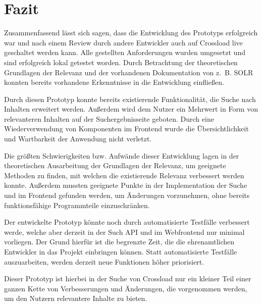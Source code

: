 \chapter{Fazit}
\label{ch:summary}

Zusammenfassend lässt sich sagen, dass die Entwicklung des Prototyps erfolgreich war und nach einem Review durch andere Entwickler auch auf Crossload live geschaltet werden kann.
Alle gestellten Anforderungen wurden umgesetzt und sind erfolgreich lokal getestet worden.
Durch Betrachtung der theoretischen Grundlagen der Relevanz und der vorhandenen Dokumentation von z. B. SOLR konnten bereits vorhandene Erkenntnisse in die Entwicklung einfließen.

Durch diesen Prototyp konnte bereits existierende Funktionalität, die Suche nach Inhalten erweitert werden.
Außerdem wird dem Nutzer ein Mehrwert in Form von relevanteren Inhalten auf der Suchergebnisseite geboten.
Durch eine Wiederverwendung von Komponenten im Frontend wurde die Übersichtlichkeit und Wartbarkeit der Anwendung nicht verletzt.

Die größten Schwierigkeiten bzw. Aufwände dieser Entwicklung lagen in der theoretischen Ausarbeitung der Grundlagen der Relevanz, um geeignete Methoden zu finden, mit welchen die existierende Relevanz verbessert werden konnte.
Außerdem mussten geeignete Punkte in der Implementation der Suche und im Frontend gefunden werden, um Änderungen vorzunehmen, ohne bereits funktionsfähige Programmteile einzuschränken.

Der entwickelte Prototyp könnte noch durch automatisierte Testfälle verbessert werde, welche aber derzeit in der Such API und im Webfrontend nur minimal vorliegen.
Der Grund hierfür ist die begrenzte Zeit, die die ehrenamtlichen Entwickler in das Projekt einbringen können.
Statt automatisierte Testfälle auszuarbeiten, werden derzeit neue Funktionen höher priorisiert.

Dieser Prototyp ist hierbei in der Suche von Crossload nur ein kleiner Teil einer ganzen Kette von Verbesserungen und Änderungen, die vorgenommen werden, um den Nutzern relevantere Inhalte zu bieten.
